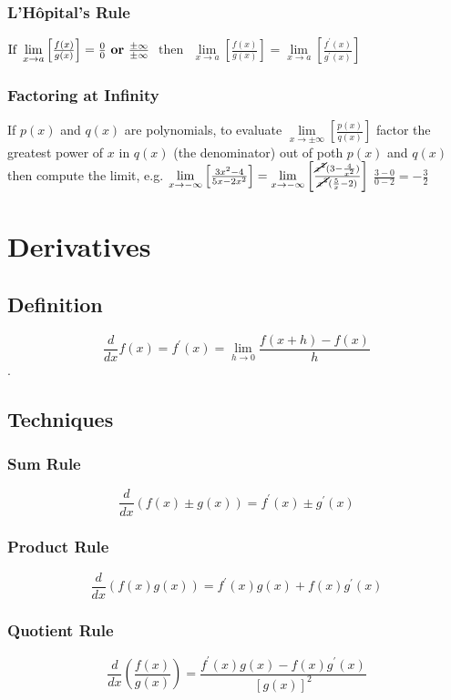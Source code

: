 \documentclass[10pt,landscape,letterpaper]{cheatsheet}
\begin{document}
\subsubsection*{L'H\^opital's Rule}
$ \text{If } \lim\limits_{x\to a}\left[\frac{f(x)}{g(x)}\right]=\frac{0}{0} \text { \textbf{or} } \frac{\pm \infty}{\pm \infty}$
$ \text{ then } $
$ \lim\limits_{x\to a}\left[\frac{f(x)}{g(x)}\right]=\lim\limits_{x\to a}\left[\frac{f^{\prime}(x)}{g^{\prime}(x)}\right] $

\subsubsection*{Factoring at Infinity}
If $p(x)$ and $q(x)$ are polynomials, to evaluate $\lim\limits_{x\to \pm \infty}\left[\frac{p(x)}{q(x)}\right]$ factor the greatest power of $x$ in $q(x)$ (the denominator) out of poth $p(x)$ and $q(x)$ then compute the limit, e.g.
$ \lim\limits_{x\to -\infty}\left[\frac{3x^2-4}{5x-2x^2}\right]=\lim\limits_{x\to -\infty}\left[\frac{\cancel{x^2}(3-\frac{4}{x^2})}{\cancel{x^2}(\frac{5}{x}-2)}\right]$
$ \frac{3-0}{0-2} = -\frac{3}{2} $
\section*{Derivatives}
\subsection*{Definition}
$$ \frac{d}{dx}f(x) = f^{\prime}(x) = \lim\limits_{h\to 0}\frac{f(x+h)-f(x)}{h}$$.
\subsection*{Techniques}

\subsubsection*{Sum Rule}
$$ \frac{d}{dx}(f(x) \pm g(x))=f^{\prime}(x) \pm g^{\prime}(x) $$

\subsubsection*{Product Rule}
$$ \frac{d}{dx}(f(x)g(x))=f^{\prime}(x)g(x)+f(x)g^{\prime}(x) $$

\subsubsection*{Quotient Rule}
$$ \frac{d}{dx}\left(\frac{f(x)}{g(x)}\right)=\frac{f^{\prime}(x)g(x)-f(x)g^{\prime}(x)}{[g(x)]^2} $$
\end{document}
